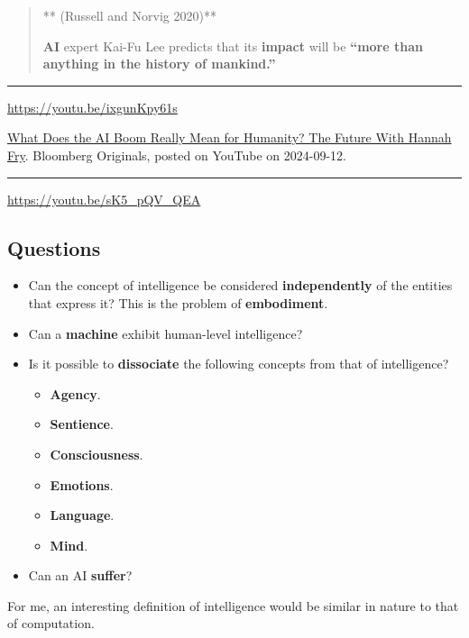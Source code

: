\documentclass[
  letterpaper,
  DIV=11,
  numbers=noendperiod]{scrartcl}
\providecommand{\tightlist}{%
  \setlength{\itemsep}{0pt}\setlength{\parskip}{0pt}}
\begin{document}
\begin{quote}
** (Russell and Norvig 2020)**

\textbf{AI} expert Kai-Fu Lee predicts that its \textbf{impact} will be
\textbf{``more than anything in the history of mankind.''}
\end{quote}

\begin{center}\rule{0.5\linewidth}{0.5pt}\end{center}

\url{https://youtu.be/ixgunKpy61s}

\href{https://youtu.be/ixgunKpy61s}{What Does the AI Boom Really Mean
for Humanity? \textbar{} The Future With Hannah Fry}. Bloomberg
Originals, posted on YouTube on 2024-09-12.

\begin{center}\rule{0.5\linewidth}{0.5pt}\end{center}

\url{https://youtu.be/sK5_pQV_QEA}

\subsection{Questions}\label{questions}

\begin{itemize}
\item
  Can the concept of intelligence be considered \textbf{independently}
  of the entities that express it? This is the problem of
  \textbf{embodiment}.
\item
  Can a \textbf{machine} exhibit human-level intelligence?
\item
  Is it possible to \textbf{dissociate} the following concepts from that
  of intelligence?

  \begin{itemize}
  \tightlist
  \item
    \textbf{Agency}.
  \item
    \textbf{Sentience}.
  \item
    \textbf{Consciousness}.
  \item
    \textbf{Emotions}.
  \item
    \textbf{Language}.
  \item
    \textbf{Mind}.
  \end{itemize}
\item
  Can an AI \textbf{suffer}?
\end{itemize}

For me, an interesting definition of intelligence would be similar in
nature to that of computation.
\end{document}
